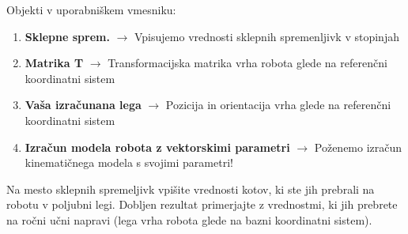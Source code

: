 Objekti v uporabniškem vmesniku:
\begin{enumerate}
    \vspace{-0.2cm}%
    \item[] \textbf{Sklepne sprem.} $\longrightarrow$ Vpisujemo vrednosti sklepnih spremenljivk v stopinjah%
    \vspace{-0.2cm}%
    \item[] \textbf{Matrika T} $\longrightarrow$ Transformacijska matrika vrha robota glede na referenčni koordinatni sistem %
    \vspace{-0.2cm}%
    \item[] \textbf{Vaša izračunana lega} $\longrightarrow$ Pozicija in orientacija vrha glede na referenčni koordinatni sistem %
    \vspace{-0.2cm}%
    \item[] \textbf{Izračun modela robota z vektorskimi parametri} $\longrightarrow$ Poženemo izračun kinematičnega modela s svojimi parametri! %
\end{enumerate}

Na mesto sklepnih spremeljivk vpišite vrednosti kotov, ki ste jih prebrali na robotu v poljubni legi. Dobljen rezultat primerjajte z vrednostmi, ki jih prebrete na ročni učni napravi (lega vrha robota glede na bazni koordinatni sistem).